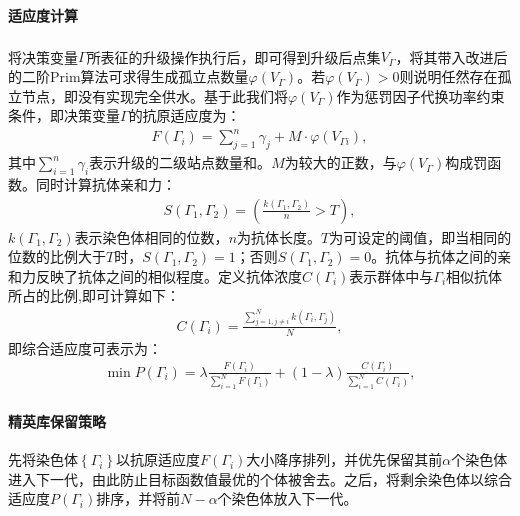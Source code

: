 \documentclass{whutmod}
\newcommand{\upcite}[1]{\textsuperscript{\cite{#1}}}
\begin{document}
     	\paragraph{适应度计算}
    将决策变量$\Gamma$所表征的升级操作执行后\upcite{5}，即可得到升级后点集$V_{\Gamma}$，将其带入改进后的二阶Prim算法可求得生成孤立点数量$\varphi(V_{\Gamma})$。若$\varphi(V_{\Gamma})>0$则说明任然存在孤立节点，即没有实现完全供水。基于此我们将$\varphi(V_{\Gamma})$作为惩罚因子代换功率约束条件，即决策变量$\Gamma$的抗原适应度为：
    	\begin{gather}
    	F(\Gamma_i)=\sum_{j=1}^{n}\gamma_j+ M\cdot  \varphi(V_{\Gamma i}),
    	\end{gather}
    其中$\displaystyle \sum_{i=1}^{n}\gamma_i$表示升级的二级站点数量和。$M$为较大的正数，与$\varphi(V_{\Gamma})$构成罚函数。同时计算抗体亲和力：
    	\begin{gather}
    	S(\Gamma_1,\Gamma_2)=(\frac{k(\Gamma_1,\Gamma_2)}{n}>T),
        \end{gather}
    $k(\Gamma_1,\Gamma_2)$表示染色体相同的位数，$n$为抗体长度。$T$为可设定的阈值，即当相同的位数的比例大于$T$时，$S(\Gamma_1,\Gamma_2)=1$；否则$S(\Gamma_1,\Gamma_2)=0$。抗体与抗体之间的亲和力反映了抗体之间的相似程度。定义抗体浓度$C(\Gamma_i)$表示群体中与$\Gamma_i$相似抗体所占的比例,即可计算如下：
     \begin{gather}
     C(\Gamma_i)=\displaystyle \frac{\displaystyle \sum _{j=1,j\neq i}^N k(\Gamma_i,\Gamma_j)}{N},
     \end{gather}
     即综合适应度可表示为：
  	 \begin{gather}
  \min	P(\Gamma_i)=\lambda \frac{F(\Gamma_i)}{\displaystyle \sum _{i=1}^N F(\Gamma_i)}+(1-\lambda )\frac{C(\Gamma_i)}{\displaystyle \sum _{i=1}^N C(\Gamma_i)},
  	\end{gather}
  	\paragraph{精英库保留策略}
  	先将染色体$\left \{ \Gamma_i \right \}$以抗原适应度$F(\Gamma_i)$大小降序排列，并优先保留其前$\alpha$个染色体进入下一代，由此防止目标函数值最优的个体被舍去。之后，将剩余染色体以综合适应度$P(\Gamma_i)$排序，并将前$N-\alpha$个染色体放入下一代。
	  
\end{document}
